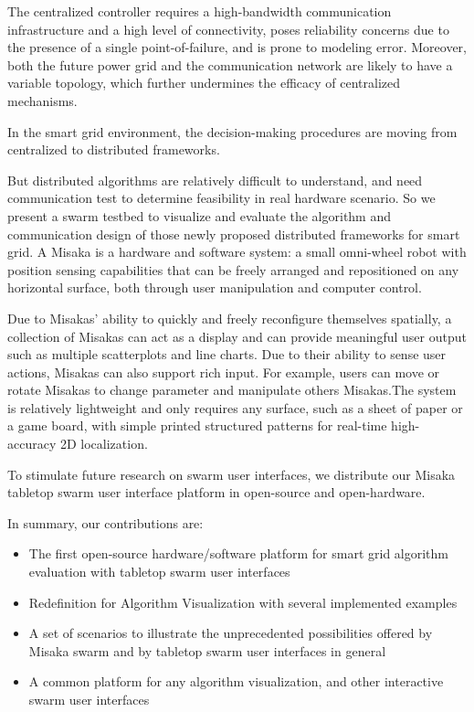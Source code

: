 \documentclass[conference]{IEEEtran}
\begin{document}
The centralized controller requires a high-bandwidth communication infrastructure and a high level of connectivity, poses reliability concerns due to the presence of a single point-of-failure, and is prone to modeling error. Moreover, both the future power grid and the communication network are likely to have a variable topology, which further undermines the efficacy of centralized mechanisms\cite{binetti2013distributed}.

In the smart grid environment, the decision-making procedures are moving from centralized to distributed frameworks\cite{yang2011communication}.

But distributed algorithms are relatively difficult to understand, and need communication test to determine feasibility in real hardware scenario. So we present a swarm testbed to visualize and evaluate the algorithm and communication design of those newly proposed distributed frameworks for smart grid. A Misaka is a hardware and software system: a small omni-wheel robot with position sensing capabilities that can be freely arranged and repositioned on any horizontal surface, both through user manipulation and computer control. 

Due to Misakas’ ability to quickly and freely reconfigure themselves spatially, a collection of Misakas can act as a display and can provide meaningful user output such as multiple scatterplots and line charts. Due to their ability to sense user actions, Misakas can also support rich input. For example, users can move or rotate Misakas to change parameter and manipulate others Misakas.The system is relatively lightweight and only requires any surface, such as a sheet of paper or a game board, with simple printed structured patterns for real-time high-accuracy 2D localization.

To stimulate future research on swarm user interfaces, we distribute our Misaka tabletop swarm user interface platform in open-source and open-hardware.

In summary, our contributions are:

\begin{itemize}
    \item The first open-source hardware/software platform for smart grid algorithm evaluation with tabletop swarm user interfaces
    \item Redefinition for Algorithm Visualization with several implemented examples
    \item A set of scenarios to illustrate the unprecedented possibilities offered by Misaka swarm and by tabletop swarm user interfaces in general
    \item A common platform for any algorithm visualization, and other interactive swarm user interfaces
\end{itemize}
\end{document}
